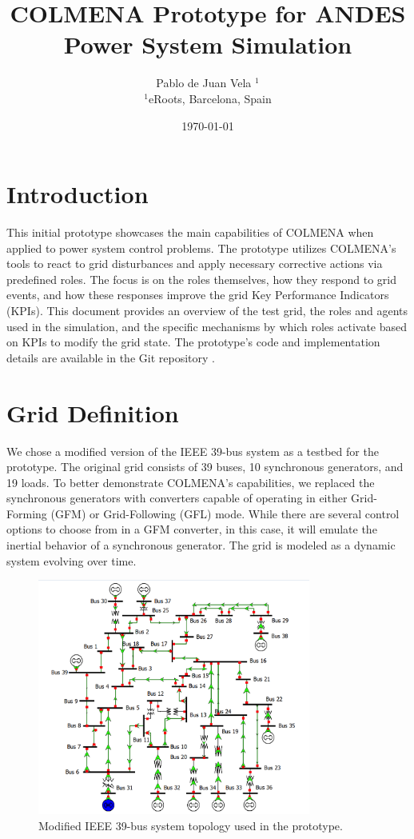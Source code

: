 \documentclass{article}
\title{COLMENA Prototype for ANDES Power System Simulation}
\author{Pablo de Juan Vela $^{1}$ \\
        \small $^{1}$eRoots, Barcelona, Spain \\
}
\date{\today}
\begin{document}
\maketitle

\section{Introduction}

This initial prototype showcases the main capabilities of COLMENA when applied to power system control problems. The prototype utilizes COLMENA's tools to react to grid disturbances and apply necessary corrective actions via predefined roles. The focus is on the roles themselves, how they respond to grid events, and how these responses improve the grid Key Performance Indicators (KPIs). This document provides an overview of the test grid, the roles and agents used in the simulation, and the specific mechanisms by which roles activate based on KPIs to modify the grid state. The prototype's code and implementation details are available in the Git repository \cite{git:eroots}.

\section{Grid Definition}

We chose a modified version of the IEEE 39-bus system \cite{grids:ieee39} as a testbed for the prototype. The original grid consists of 39 buses, 10 synchronous generators, and 19 loads. To better demonstrate COLMENA's capabilities, we replaced the synchronous generators with converters capable of operating in either Grid-Forming (GFM) or Grid-Following (GFL) mode. While there are several control options to choose from in a GFM converter, in this case, it will emulate the inertial behavior of a synchronous generator. The grid is modeled as a dynamic system evolving over time.
\begin{figure}[h]
    \centering
    \begin{center}
        \includegraphics[width=0.8\textwidth]{plots/IEEE39 (1).png}
    \end{center}
    \caption{Modified IEEE 39-bus system topology used in the prototype.}
    \label{fig:ieee39_topology}
\end{figure}
\end{document}
